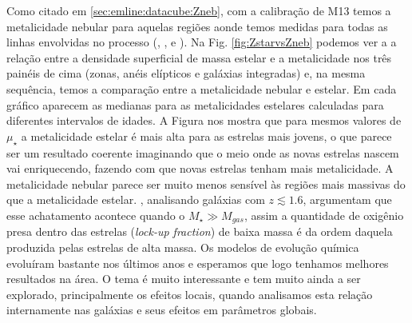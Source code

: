 Como citado em \ref{sec:emline:datacube:Zneb}, com a calibração de M13 temos a metalicidade nebular
para aquelas regiões aonde temos medidas para todas as linhas envolvidas no processo (\Hbeta, \oIII,
\Halpha e \nII). Na Fig. \ref{fig:ZstarvsZneb} podemos ver a a relação entre a densidade superficial
de massa estelar e a metalicidade nos três painéis de cima (zonas, anéis elípticos e galáxias
integradas) e, na mesma sequência, temos a comparação entre a metalicidade nebular e estelar. Em
cada gráfico aparecem as medianas para as metalicidades estelares calculadas para diferentes
intervalos de idades. A Figura nos mostra que para mesmos valores de $\mu_\star$ a metalicidade
estelar é mais alta para as estrelas mais jovens, o que parece ser um resultado coerente imaginando
que o meio onde as novas estrelas nascem vai enriquecendo, fazendo com que novas estrelas tenham
mais metalicidade. A metalicidade nebular parece ser muito menos sensível às regiões mais massivas
do que a metalicidade estelar. \citet{Zahid.etal.2014a}, analisando galáxias com $z \lesssim 1.6$,
argumentam que esse achatamento acontece quando o $M_\star \gg M_{gas}$, assim a quantidade de
oxigênio presa dentro das estrelas ({\em lock-up fraction}) de baixa massa é da ordem daquela
produzida pelas estrelas de alta massa. Os modelos de evolução química evoluíram bastante nos
últimos anos \citep[e.g., ][]{Lilly.etal.2013a, Peng.Maiolino.2014a, Ascasibar.etal.2015a,
Peng.Maiolino.Cochrane.2015a} e esperamos que logo tenhamos melhores resultados na área. O tema é
muito interessante e tem muito ainda a ser explorado, principalmente os efeitos locais, quando
analisamos esta relação internamente nas galáxias e seus efeitos em parâmetros globais.

